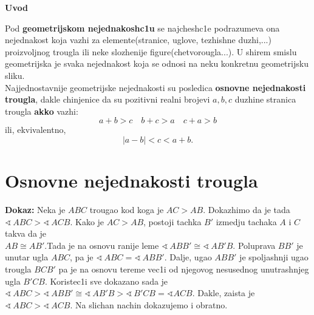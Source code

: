 \documentclass[11pt]{article}
\def\ug{\mathbin{\sphericalangle\,}}
\begin{document}
\newpage
\begin{large}
\vspace*{-1.5in}
\begin{center}
\vspace{0.2in}
\huge \textbf{Uvod}
\end{center}
\vspace{0.2in}
\begin{flushleft}
 Pod \textbf{geometrijskom nejednakosh{}c1u} se najchesh{}c1e podrazumeva ona nejednakost koja vazhi za elemente(stranice, uglove, tezhishne duzhi,...) proizvoljnog trougla ili neke slozhenije figure(chetvorougla...). U shirem smislu geometrijska je svaka nejednakost koja se odnosi na neku konkretnu geometrijsku sliku.\\

Najjednostavnije geometrijske nejednakosti su posledica \textbf{osnovne nejednakosti trougla}, dakle chinjenice da su pozitivni realni brojevi $a,b,c$ duzhine stranica trougla \textbf{akko} vazhi:$$a+b>c \quad b+c>a\quad c+a>b$$
ili, ekvivalentno, $$|a-b|<c<a+b.$$
\section*{\centering \LARGE Osnovne nejednakosti trougla}
\begin{frame}{}
\end{frame}

\vspace{0.1in}
\textbf{Dokaz:} Neka je $ABC$ trougao kod koga je $AC>AB$. Dokazhimo da je tada\\
$\ug ABC > \ug ACB$. Kako je $AC>AB$, postoji tachka $B'$ izmedju tachaka $A$ i $C$ takva da je \\$AB\cong AB'$.Tada je na osnovu ranije leme $\ug ABB'\cong \ug AB'B$. Poluprava $BB'$ je unutar ugla $ABC$, pa je $\ug ABC =\ug ABB'$. Dalje, ugao $ABB'$ je spoljashnji ugao trougla $BCB'$ pa je na osnovu tereme vec1i od njegovog nesusednog unutrashnjeg ugla $B'CB$. Koristec1i sve dokazano sada je $\ug ABC>\ug ABB' \cong \ug AB'B>\ug B'CB=\sphericalangle ACB.$ Dakle, zaista je $ \ug ABC>\ug ACB$. Na slichan nachin dokazujemo i obratno.\\
\vspace{0.5cm}


\end{flushleft}
\end{large}
\end{document}
